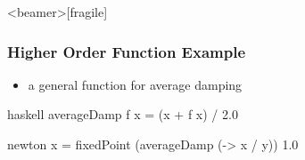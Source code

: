 \documentclass[dvipsnames]{beamer}
\theoremstyle{plain}
\begin{document}
\begin{frame}<beamer>[fragile]
  \frametitle{Higher Order Function Example}

  \begin{example}
    \begin{itemize}
      \item a general function for average damping
    \end{itemize}
    \begin{pygments}{haskell}
averageDamp f x = (x + f x) / 2.0

newton x = fixedPoint (averageDamp (\y -> x / y)) 1.0
    \end{pygments}
  \end{example}
\end{frame}
%
%
%
\end{document}
